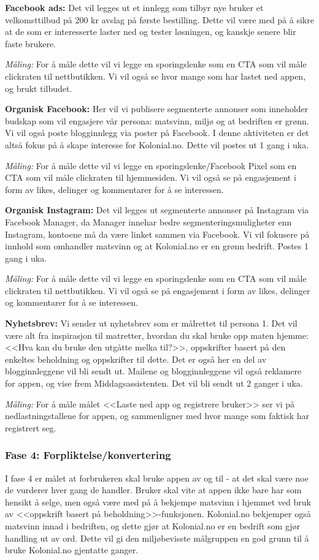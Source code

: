 \textbf{Facebook ads:} Det vil legges ut et innlegg som tilbyr nye bruker et velkomsttilbud på 200 kr avslag på første bestilling. Dette vil være med på å sikre at de som er interesserte laster ned og tester løsningen, og kanskje senere blir faste brukere. 

\textit{Måling:} For å måle dette vil vi legge en sporingslenke som en CTA som vil måle clickraten til nettbutikken. Vi vil også se hvor mange som har lastet ned appen, og brukt tilbudet. 

\textbf{Organisk Facebook:} Her vil vi publisere segmenterte annonser som inneholder budskap som vil engasjere vår persona: matsvinn, miljø og at bedriften er grønn. Vi vil også poste blogginnlegg via poster på Facebook. I denne aktiviteten er det altså fokus på å skape interesse for Kolonial.no. Dette vil postes ut 1 gang i uka. 

\textit{Måling:} For å måle dette vil vi legge en sporingslenke/Facebook Pixel som en CTA som vil måle clickraten til hjemmesiden. Vi vil også se på engasjement i form av likes, delinger og kommentarer for å se interessen.  

\textbf{Organisk Instagram:} Det vil legges ut segmenterte annonser på Instagram via Facebook Manager, da Manager innehar bedre segmenteringsmuligheter enn Instagram, kontoene må da være linket sammen via Facebook. Vi vil fokusere på innhold som omhandler matsvinn og at Kolonial.no er en grønn bedrift. Postes 1 gang i uka. 

\textit{Måling:} For å måle dette vil vi legge en sporingslenke som en CTA som vil måle clickraten til nettbutikken. Vi vil også se på engasjement i form av likes, delinger og kommentarer for å se interessen. 

\textbf{Nyhetsbrev:} Vi sender ut nyhetsbrev som er målrettet til persona 1. Det vil være alt fra inspirasjon til matretter, hvordan du skal bruke opp maten hjemme: <<Hva kan du bruke den utgåtte melka til?>>, oppskrifter basert på den enkeltes beholdning og oppskrifter til dette. Det er også her en del av blogginnleggene vil bli sendt ut. Mailene og blogginnleggene vil også reklamere for appen, og vise frem Middagsassistenten. Det vil bli sendt ut 2 ganger i uka. 

\textit{Måling:} For å måle målet <<Laste ned app og registrere bruker>> ser vi på nedlastningstallene for appen, og sammenligner med hvor mange som faktisk har registrert seg. 

\subsubsection{\textbf{Fase 4: Forpliktelse/konvertering}}
I fase 4 er målet at forbrukeren skal bruke appen av og til - at det skal være noe de vurderer  hver gang de handler. Bruker skal vite at appen ikke bare har som hensikt å selge, men også være med på å bekjempe matsvinn i hjemmet ved bruk av <<oppskrift basert på beholdning>>-funksjonen. Kolonial.no bekjemper også matsvinn innad i bedriften, og dette gjør at Kolonial.no er en bedrift som gjør handling ut av ord. Dette vil gi den miljøbevisste målgruppen en god grunn til å bruke Kolonial.no gjentatte ganger. 


